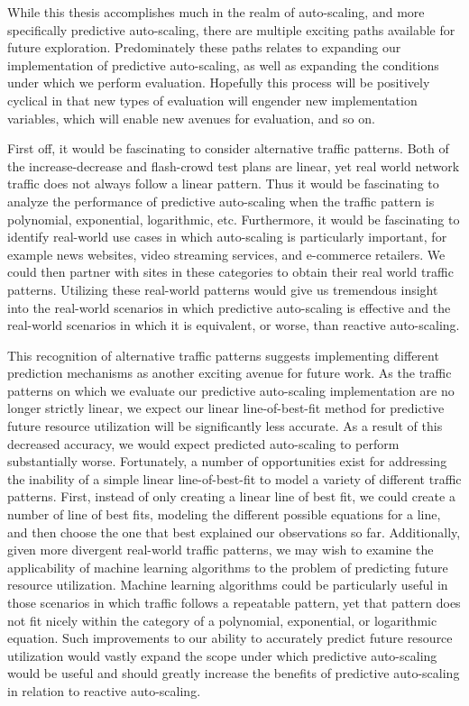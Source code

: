 While this thesis accomplishes much in the realm of auto-scaling, and more
specifically predictive auto-scaling, there are multiple exciting paths
available for future exploration. Predominately these paths relates to expanding
our implementation of predictive auto-scaling, as well as expanding the
conditions under which we perform evaluation. Hopefully this process will be
positively cyclical in that new types of evaluation will engender new
implementation variables, which will enable new avenues for evaluation, and so
on.

First off, it would be fascinating to consider alternative traffic patterns.
Both of the increase-decrease and flash-crowd test plans are linear, yet real
world network traffic does not always follow a linear pattern. Thus it would be
fascinating to analyze the performance of predictive auto-scaling when the
traffic pattern is polynomial, exponential, logarithmic, etc. Furthermore, it
would be fascinating to identify real-world use cases in which auto-scaling is
particularly important, for example news websites, video streaming services, and
e-commerce retailers. We could then partner with sites in these categories to
obtain their real world traffic patterns. Utilizing these real-world patterns
would give us tremendous insight into the real-world scenarios in which
predictive auto-scaling is effective and the real-world scenarios in which it is
equivalent, or worse, than reactive auto-scaling.

This recognition of alternative traffic patterns suggests implementing
different prediction mechanisms as another exciting avenue for future work. As
the traffic patterns on which we evaluate our predictive auto-scaling
implementation are no longer strictly linear, we expect our linear
line-of-best-fit method for predictive future resource utilization will be
significantly less accurate. As a result of this decreased accuracy, we would
expect predicted auto-scaling to perform substantially worse. Fortunately, a
number of opportunities exist for addressing the inability of a simple linear
line-of-best-fit to model a variety of different traffic patterns.
First, instead of only creating a linear line of best fit, we could
create a number of line of best fits, modeling the different possible equations
for a line, and then choose the one that best explained our observations so far.
Additionally, given more divergent real-world traffic patterns, we may wish to
examine the applicability of machine learning algorithms to the problem of
predicting future resource utilization. Machine learning algorithms could be
particularly useful in those scenarios in which traffic follows a repeatable
pattern, yet that pattern does not fit nicely within the category of a
polynomial, exponential, or logarithmic equation. Such improvements to our
ability to accurately predict future resource utilization
would vastly expand the scope under which predictive auto-scaling would be
useful and should greatly increase the benefits of predictive auto-scaling in
relation to reactive auto-scaling.

